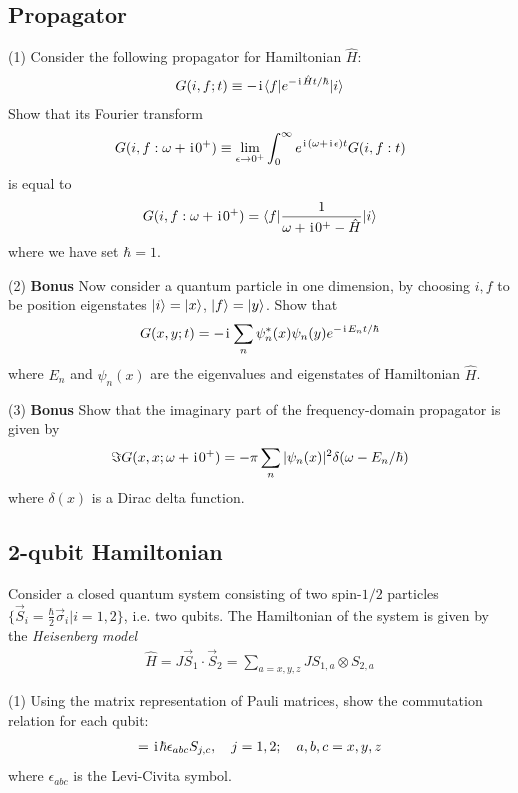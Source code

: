 \subsection{Propagator}

(1) Consider the following propagator for Hamiltonian $\hat H$:
\begin{align}
    G(i,f;t)\equiv-\hspace{1pt}\mathrm{i}\hspace{1pt}\langle{f|e^{-\hspace{1pt}\mathrm{i}\hspace{1pt}\hat Ht/\hbar}|i}\rangle
\end{align}
Show that its Fourier transform
\begin{align}
    G(i,f:\omega+\hspace{1pt}\mathrm{i}\hspace{1pt}0^+)\equiv\lim_{\epsilon\rightarrow0^+}\int_0^\infty e^{\hspace{1pt}\mathrm{i}\hspace{1pt}(\omega+\hspace{1pt}\mathrm{i}\hspace{1pt}\epsilon)t}G(i,f:t)
\end{align}
is equal to
\begin{align}
    G(i,f:\omega+\hspace{1pt}\mathrm{i}\hspace{1pt}0^+)=\langle{f|\frac{1}{\omega+\hspace{1pt}\mathrm{i}\hspace{1pt}0^+-\hat H}|i}\rangle
\end{align}
where we have set $\hbar=1$. 

(2) \textbf{Bonus} Now consider a quantum particle in one dimension, by choosing $i,f$ to be position eigenstates $|{i}\rangle=|{x}\rangle$, $|{f}\rangle=|{y}\rangle$. Show that
\begin{align}
    G(x,y;t)=-\hspace{1pt}\mathrm{i}\hspace{1pt}\sum_n\psi^\ast_n(x)\psi_n(y)e^{-\hspace{1pt}\mathrm{i}\hspace{1pt} E_nt/\hbar}
\end{align}
where $E_n$ and $\psi_n(x)$ are the eigenvalues and eigenstates of Hamiltonian $\hat H$. 

(3) \textbf{Bonus} Show that the imaginary part of the frequency-domain propagator is given by
\begin{align}
    \Im G(x,x;\omega+\hspace{1pt}\mathrm{i}\hspace{1pt}0^+)=-\pi\sum_n|\psi_n(x)|^2\delta(\omega-E_n/\hbar)
\end{align}
where $\delta(x)$ is a Dirac delta function. 

\subsection{2-qubit Hamiltonian}

Consider a closed quantum system consisting of two spin-$1/2$ particles $\{\vec S_i=\frac\hbar2\vec\sigma_i|i=1,2\}$, i.e. two qubits. The Hamiltonian of the system is given by the \emph{Heisenberg model}
\begin{align}\label{2-qubit heisenberg model}
\hat H=J\vec S_1\cdot\vec S_2=\sum_{a=x,y,z}J S_{1,a}\otimes S_{2,a}
\end{align}

(1) Using the matrix representation of Pauli matrices, show the commutation relation for each qubit:
\begin{align}
[S_{j,a},S_{j,b}]=\imth\hbar\epsilon_{abc}S_{j,c},~~~j=1,2;~~~a,b,c=x,y,z
\end{align}
where $\epsilon_{abc}$ is the Levi-Civita symbol. 

